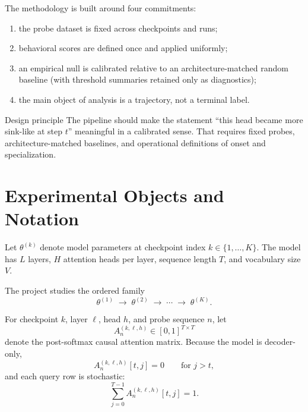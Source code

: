 \documentclass[11pt]{article}
\newcommand{\1}{\mathbf{1}}
\newcommand{\pipelinearrow}{\;\rightarrow\;}
\begin{document}
The methodology is built around four commitments:

\begin{enumerate}
\item the probe dataset is fixed across checkpoints and runs;
\item behavioral scores are defined once and applied uniformly;
\item an empirical null is calibrated relative to an architecture-matched random
baseline (with threshold summaries retained only as diagnostics);
\item the main object of analysis is a trajectory, not a terminal label.
\end{enumerate}

\begin{accentbox}{Design principle}
The pipeline should make the statement ``this head became more sink-like at
step $t$'' meaningful in a calibrated sense. That requires fixed probes,
architecture-matched baselines, and operational definitions of onset and
specialization.
\end{accentbox}

\section{Experimental Objects and Notation}

Let $\theta^{(k)}$ denote model parameters at checkpoint index
$k \in \{1,\dots,K\}$. The model has $L$ layers, $H$ attention heads per layer,
sequence length $T$, and vocabulary size $V$.

The project studies the ordered family
\[
\theta^{(1)} \pipelinearrow \theta^{(2)} \pipelinearrow \cdots \pipelinearrow \theta^{(K)}.
\]

For checkpoint $k$, layer $\ell$, head $h$, and probe sequence $n$, let
\[
A_n^{(k,\ell,h)} \in [0,1]^{T \times T}
\]
denote the post-softmax causal attention matrix. Because the model is
decoder-only,
\[
A_n^{(k,\ell,h)}[t,j] = 0 \qquad \text{for } j > t,
\]
and each query row is stochastic:
\[
\sum_{j=0}^{T-1} A_n^{(k,\ell,h)}[t,j] = 1.
\]
\end{document}
